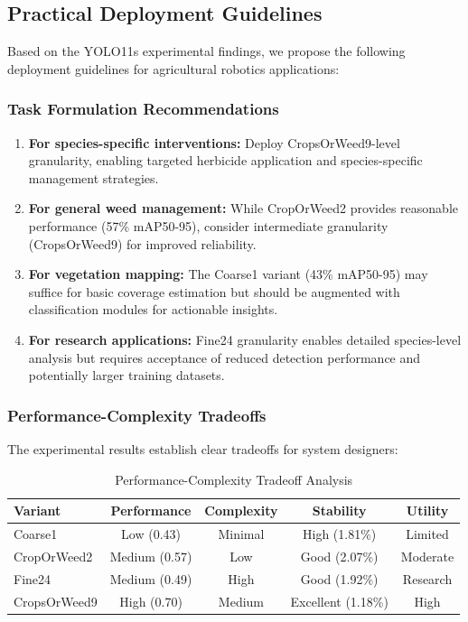 \subsection{Practical Deployment Guidelines}

Based on the YOLO11s experimental findings, we propose the following deployment guidelines for agricultural robotics applications:

\subsubsection{Task Formulation Recommendations}

\begin{enumerate}
    \item \textbf{For species-specific interventions:} Deploy CropsOrWeed9-level granularity, enabling targeted herbicide application and species-specific management strategies.
    
    \item \textbf{For general weed management:} While CropOrWeed2 provides reasonable performance (57\% mAP50-95), consider intermediate granularity (CropsOrWeed9) for improved reliability.
    
    \item \textbf{For vegetation mapping:} The Coarse1 variant (43\% mAP50-95) may suffice for basic coverage estimation but should be augmented with classification modules for actionable insights.
    
    \item \textbf{For research applications:} Fine24 granularity enables detailed species-level analysis but requires acceptance of reduced detection performance and potentially larger training datasets.
\end{enumerate}

\subsubsection{Performance-Complexity Tradeoffs}

The experimental results establish clear tradeoffs for system designers:

\begin{table}[htbp]
\centering
\caption{Performance-Complexity Tradeoff Analysis}
\label{tab:yolo11s_tradeoffs}
\begin{tabular}{lcccc}
\toprule
\textbf{Variant} & \textbf{Performance} & \textbf{Complexity} & \textbf{Stability} & \textbf{Utility} \\
\midrule
Coarse1       & Low (0.43)  & Minimal  & High (1.81\%) & Limited \\
CropOrWeed2   & Medium (0.57) & Low    & Good (2.07\%) & Moderate \\
Fine24        & Medium (0.49) & High   & Good (1.92\%) & Research \\
CropsOrWeed9  & High (0.70) & Medium  & Excellent (1.18\%) & High \\
\bottomrule
\end{tabular}
\end{table}

